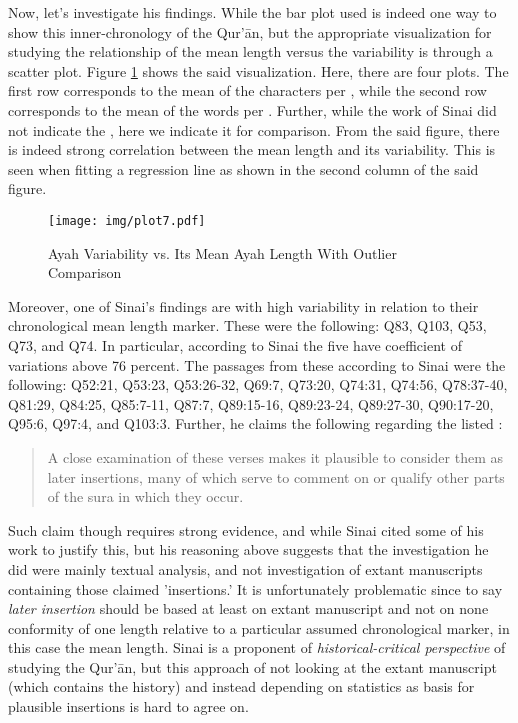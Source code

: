 Now, let's investigate his findings. While the bar plot used is indeed one way to show this inner-chronology of the Qur'\=an, but the appropriate visualization for studying the relationship of the mean   length versus the   variability is through a scatter plot. Figure \ref{fig:result_sinai_chronology} shows the said visualization. Here, there are four plots. The first row corresponds to the mean of the characters per  , while the second row corresponds to the mean of the words per  . Further, while the work of Sinai did not indicate the  , here we indicate it for comparison. From the said figure, there is indeed strong correlation between the mean   length and its variability. This is seen when fitting a regression line as shown in the second column of the said figure.

\begin{figure}[!t]
    \centering
    \texttt{[image: img/plot7.pdf]}
    \caption{Ayah Variability vs. Its Mean Ayah Length With Outlier Comparison}
    \label{fig:result_sinai_chronology}
\end{figure}

Moreover, one of Sinai's findings are   with high variability in relation to their chronological mean   length marker. These   were the following: Q83, Q103, Q53, Q73, and Q74. In particular, according to Sinai the five   have coefficient of variations above 76 percent. The passages from these   according to Sinai were the following: Q52:21, Q53:23, Q53:26-32, Q69:7, Q73:20, Q74:31, Q74:56, Q78:37-40, Q81:29, Q84:25, Q85:7-11, Q87:7, Q89:15-16, Q89:23-24, Q89:27-30, Q90:17-20, Q95:6, Q97:4, and Q103:3. Further, he claims the following regarding the listed  :
\begin{quotation}
    A close examination of these verses makes it plausible to consider them as later insertions, many of which serve to comment on or qualify other parts of the sura in which they occur.
\end{quotation}

Such claim though requires strong evidence, and while Sinai cited some of his work to justify this, but his reasoning above suggests that the investigation he did were mainly textual analysis, and not investigation of extant manuscripts containing those claimed 'insertions.' It is unfortunately problematic since to say \textit{later insertion} should be based at least on extant manuscript and not on none conformity of one   length relative to a particular assumed chronological marker, in this case the mean   length. Sinai is a proponent of \textit{historical-critical perspective} of studying the Qur'\=an, but this approach of not looking at the extant manuscript (which contains the history) and instead depending on statistics as basis for plausible insertions is hard to agree on.

